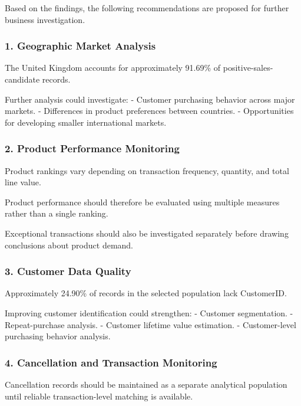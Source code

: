 \documentclass[11pt]{article}
\begin{document}
Based on the findings, the following recommendations are proposed for
further business investigation.

\subsubsection{1. Geographic Market
Analysis}\label{geographic-market-analysis}

The United Kingdom accounts for approximately 91.69\% of
positive-sales-candidate records.

Further analysis could investigate: - Customer purchasing behavior
across major markets. - Differences in product preferences between
countries. - Opportunities for developing smaller international markets.

\subsubsection{2. Product Performance
Monitoring}\label{product-performance-monitoring}

Product rankings vary depending on transaction frequency, quantity, and
total line value.

Product performance should therefore be evaluated using multiple
measures rather than a single ranking.

Exceptional transactions should also be investigated separately before
drawing conclusions about product demand.

\subsubsection{3. Customer Data Quality}\label{customer-data-quality}

Approximately 24.90\% of records in the selected population lack
CustomerID.

Improving customer identification could strengthen: - Customer
segmentation. - Repeat-purchase analysis. - Customer lifetime value
estimation. - Customer-level purchasing behavior analysis.

\subsubsection{4. Cancellation and Transaction
Monitoring}\label{cancellation-and-transaction-monitoring}

Cancellation records should be maintained as a separate analytical
population until reliable transaction-level matching is available.
\end{document}
